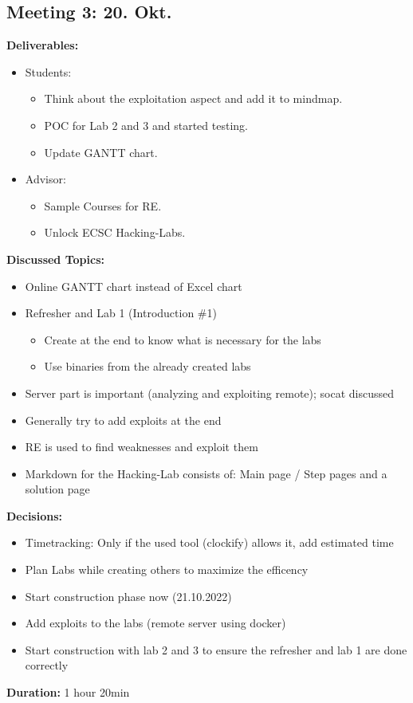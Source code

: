 \subsection*{Meeting 3: 20. Okt.}
\textbf{Deliverables:} 
\begin{itemize}
    \item Students:
    \begin{itemize}
        \item Think about the exploitation aspect and add it to mindmap.
        \item POC for Lab 2 and 3 and started testing.
        \item Update GANTT chart.
    \end{itemize}
    \item Advisor:
    \begin{itemize}
        \item Sample Courses for RE.
        \item Unlock ECSC Hacking-Labs. 
    \end{itemize}
\end{itemize}
\textbf{Discussed Topics:} 
\begin{itemize}
    \item Online GANTT chart instead of Excel chart
    \item Refresher and Lab 1 (Introduction \#1)
    \begin{itemize}
        \item Create at the end to know what is necessary for the labs
        \item Use binaries from the already created labs
    \end{itemize}
    \item Server part is important (analyzing and exploiting remote); socat discussed
    \item Generally try to add exploits at the end
    \item RE is used to find weaknesses and exploit them
    \item Markdown for the Hacking-Lab consists of: Main page / Step pages and a solution page
\end{itemize}
\textbf{Decisions:}
\begin{itemize}
    \item Timetracking: Only if the used tool (clockify) allows it, add estimated time
    \item Plan Labs while creating others to maximize the efficency
    \item Start construction phase now (21.10.2022)
    \item Add exploits to the labs (remote server using docker)
    \item Start construction with lab 2 and 3 to ensure the refresher and lab 1 are done correctly
\end{itemize}
\textbf{Duration:} 1 hour 20min

